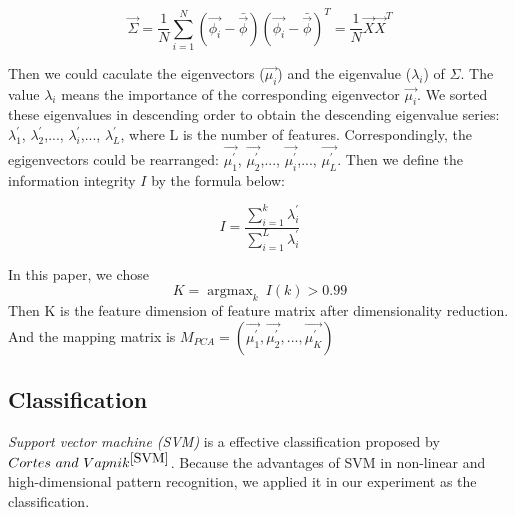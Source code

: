 \documentclass[runningheads,a4paper]{llncs}
\begin{document}
\begin{equation}
  \vec{\Sigma} = \frac{1}{N}\sum_{i=1}^{N}(\vec{\phi_i}-\bar{\vec{\phi}})(\vec{\phi_i}-\bar{\vec{\phi}})^T = \frac{1}{N}\vec{X}{\vec{X}}^T
\end{equation}

Then we could caculate the eigenvectors ($\vec{\mu_i}$) and the eigenvalue ($\lambda_i$)
 of $\Sigma$. The value $\lambda_i$ means the importance of the corresponding
 eigenvector $\vec{\mu_i}$. We sorted these eigenvalues in descending order to obtain
the descending eigenvalue series: $\lambda_1^\prime$, $\lambda_2^\prime$,...,
$\lambda_i^\prime$,..., $\lambda_L^\prime$, where L is the number of features.
Correspondingly, the egigenvectors could be rearranged: $\vec{\mu_1^\prime}$,
$\vec{\mu_2^\prime}$,..., $\vec{\mu_i^\prime}$,..., $\vec{\mu_L^\prime}$.
Then we define the information integrity $I$ by the formula below:

\begin{equation}
  I = \frac{\sum_{i=1}^{k}\lambda_i^\prime}{\sum_{i=1}^{L}\lambda_i^\prime}
\end{equation}

In this paper, we chose
\begin{equation}
  K = \mathop{\arg\max}_{k} \ I(k)>0.99
\end{equation}
Then K is the feature dimension of feature matrix after dimensionality reduction.
And the mapping matrix is $M_{PCA} = (\vec{\mu_1^\prime},
\vec{\mu_2^\prime},..., \vec{\mu_K^\prime})$

\subsection{Classification}
\emph{Support vector machine (SVM)} is a effective classification proposed
by $Cortes\ and\ Vapnik^{\cite{SVM}}$. Because the advantages of SVM in non-linear
and high-dimensional pattern recognition, we applied it in our experiment as
the classification.
\end{document}
